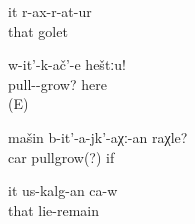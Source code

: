 \begin{exe}
	\ex	\label{ex:He left her (at home)}
	\gll	it	r-ax-r-at-ur\\
		that	golet\\
	\glt	{}

	\ex	\label{ex:Move here}
	\gll	w-it'-k-ač'-e	heštːu!\\
		pull--grow?	here\\
	\glt	{} (E)

	\ex	\label{ex:(What) if the car does not move}
	\gll	mašin	b-it'-a-jk'-aχː-an	raχle?\\
		car	pullgrow(?)	if\\
	\glt	{}

	\ex	\label{ex:He will / should go to sleep}
	\gll	it	us-kalg-an	ca-w\\
		that	lie-remain	\\
	\glt	{}
\end{exe}
